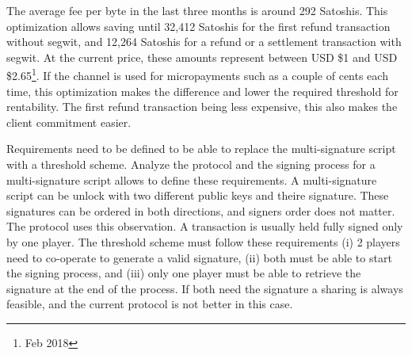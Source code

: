 The average fee per byte in the last three months is around 292 Satoshis. This optimization allows saving until 32,412 Satoshis for the first refund transaction without \gls{segwit}, and 12,264 Satoshis for a refund or a settlement transaction with \gls{segwit}. At the current price, these amounts represent between USD \$1 and USD \$2.65\footnote{ Feb 2018}. If the channel is used for micropayments such as a couple of cents each time, this optimization makes the difference and lower the required threshold for rentability. The first refund transaction being less expensive, this also makes the client commitment easier.

Requirements need to be defined to be able to replace the multi-signature script with a threshold scheme. Analyze the protocol and the signing process for a multi-signature script allows to define these requirements. A multi-signature script can be unlock with two different public keys and theire signature. These signatures can be ordered in both directions, and signers order does not matter. The protocol uses this observation. A transaction is usually held fully signed only by one player. The threshold scheme must follow these requirements (i) 2 players need to co-operate to generate a valid signature, (ii) both must be able to start the signing process, and (iii) only one player must be able to retrieve the signature at the end of the process. If both need the signature a sharing is always feasible, and the current protocol is not better in this case.

